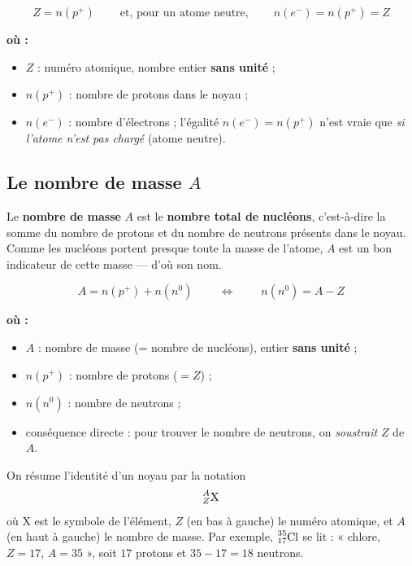\documentclass[11pt,a4paper]{article}
\newenvironment{ou}{%
  \par\smallskip\noindent\textbf{où :}\nopagebreak
  \begin{itemize}[leftmargin=1.8em,topsep=2pt,itemsep=1.5pt,parsep=0pt]}%
  {\end{itemize}}
\newcommand{\nuc}[3]{\prescript{#1}{#2}{\mathrm{#3}}}  %
\newcommand{\pp}{p^{+}}      %
\newcommand{\ee}{e^{-}}      %
\newcommand{\nz}{n^{0}}      %
\newcommand{\np}{n(\pp)}     %
\renewcommand{\ne}{n(\ee)}   %
\newcommand{\nnn}{n(\nz)}    %
\begin{document}
\begin{formule}
\[ \boxed{\ Z = \np\ } \qquad\text{et, pour un atome neutre,}\qquad \boxed{\ \ne = \np = Z\ } \]
\begin{ou}
  \item $Z$ : numéro atomique, nombre entier \textbf{sans unité} ;
  \item $\np$ : nombre de protons dans le noyau ;
  \item $\ne$ : nombre d'électrons ; l'égalité $\ne = \np$ n'est vraie que \emph{si l'atome n'est pas
        chargé} (atome neutre).
\end{ou}
\end{formule}

\subsection{Le nombre de masse \texorpdfstring{$A$}{A}}

\begin{definition}
Le \textbf{nombre de masse} $A$ est le \textbf{nombre total de nucléons}, c'est-à-dire la somme du
nombre de protons et du nombre de neutrons présents dans le noyau. Comme les nucléons portent presque
toute la masse de l'atome, $A$ est un bon indicateur de cette masse — d'où son nom.
\end{definition}

\begin{formule}
\[ \boxed{\ A = \np + \nnn\ } \qquad\Longleftrightarrow\qquad \boxed{\ \nnn = A - Z\ } \]
\begin{ou}
  \item $A$ : nombre de masse (= nombre de nucléons), entier \textbf{sans unité} ;
  \item $\np$ : nombre de protons ($=Z$) ;
  \item $\nnn$ : nombre de neutrons ;
  \item conséquence directe : pour trouver le nombre de neutrons, on \emph{soustrait} $Z$ de $A$.
\end{ou}
\end{formule}

\begin{definition}
On résume l'identité d'un noyau par la notation
\[ \nuc{A}{Z}{X} \]
où $\mathrm{X}$ est le symbole de l'élément, $Z$ (en bas à gauche) le numéro atomique, et $A$ (en haut
à gauche) le nombre de masse. Par exemple, $\nuc{35}{17}{Cl}$ se lit : « chlore, $Z = 17$, $A = 35$ »,
soit $17$ protons et $35 - 17 = 18$ neutrons.
\end{definition}
\end{document}

